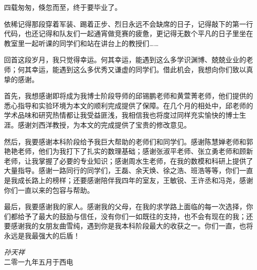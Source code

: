 
\begin{acknowledgments}

四载匆匆，倏忽而至，终于要毕业了。

依稀记得那段穿着军装、踢着正步、烈日永远不会缺席的日子，记得敲下的第一行代码，也还记得和队友们一起通宵做竞赛的疲惫，更记得无数个平凡的日子里坐在教室里一起听课的同学们和站在讲台上的教授们……

回首这段岁月，我只觉得幸运。何其幸运，能遇到这么多学识渊博、兢兢业业的老师；何其幸运，能遇到这么多优秀又谦虚的同学们。借此机会，我想向你们致以真挚的感谢。

首先，我想感谢即将成为我博士阶段导师的邱锡鹏老师和黄萱菁老师，他们提供的悉心指导和实验环境为本文的顺利完成提供了保障。在几个月的相处中，邱老师的学术品味和研究热情都让我受益匪浅，我相信我也将度过同样充实愉快的博士生涯。感谢刘西洋教授，为本文的完成提供了宝贵的修改意见。

然后，我要感谢本科阶段给予我巨大帮助的老师们和同学们。感谢陈慧婵老师和郭艳艳老师，他们为我打下了扎实的数理基础；感谢张淑平老师、张立勇老师和顾新老师，让我掌握了必要的专业知识；感谢周水生老师，在我的数模和科研上提供了大量指导。感谢一路同行的同学们，王磊、余天焕、徐之浩、班浩等等，你们一直是我成长路上的榜样；还要感谢陪伴我四年的室友，王敏锐、王许丞和冯尧，感谢你们一直以来的包容与帮助。

最后，我要感谢我的家人。感谢我的父母，在我的求学路上面临的每一次选择，你们都给予了最大的鼓励与信任，没有你们一如既往的支持，也不会有现在的我；还要感谢我的女朋友曲雪纯，遇到你是我本科阶段最大的收获之一。你们一直，也将永远是我最强大的后盾！

\begin{flushright}
	\emph{孙天祥}\\
	二零一九年五月于西电
\end{flushright}

\end{acknowledgments}

